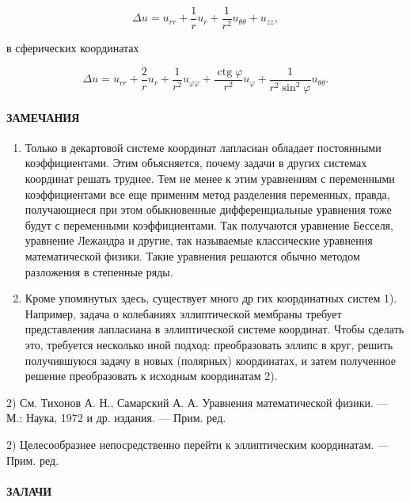 \documentclass[
  ukrainian,
]{article}
\begin{document}
\[
\Delta u = u_{rr} + \frac{1}{r} u_r + \frac{1}{r^2} u_{\theta\theta} + u_{zz},
\]

в сферических координатах

\[
\Delta u = u_{rr} + \frac{2}{r} u_r + \frac{1}{r^2} u_{\varphi\varphi} + \frac{\operatorname{ctg} \varphi}{r^2} u_{\varphi} + \frac{1}{r^2 \sin^2 \varphi} u_{\theta\theta}.
\]

\paragraph{ЗАМЕЧАНИЯ}\label{ux437ux430ux43cux435ux447ux430ux43dux438ux44f-7}

\begin{enumerate}
\def\labelenumi{\arabic{enumi}.}
\item
  Только в декартовой системе координат лапласиан обладает постоянными
  коэффициентами. Этим объясняется, почему задачи в других системах
  координат решать труднее. Тем не менее к этим уравнениям с переменными
  коэффициентами все еще применим метод разделения переменных, правда,
  получающиеся при этом обыкновенные дифференциальные уравнения тоже
  будут с переменными коэффициентами. Так получаются уравнение Бесселя,
  уравнение Лежандра и другие, так называемые классические уравнения
  математической физики. Такие уравнения решаются обычно методом
  разложения в степенные ряды.
\item
  Кроме упомянутых здесь, существует много др гих координатных систем
  1). Например, задача о колебаниях эллиптической мембраны требует
  представления лапласиана в эллиптической системе координат. Чтобы
  сделать это, требуется несколько иной подход: преобразовать эллипс в
  круг, решить получившуюся задачу в новых (полярных) координатах, и
  затем полученное решение преобразовать к исходным координатам 2).
\end{enumerate}

2) См. Тихонов А. Н., Самарский А. А. Уравнения математической физики.
--- М.: Наука, 1972 и др. издания. --- Прим. ред.

2) Целесообразнее непосредственно перейти к эллиптическим координатам.
--- Прим. ред.

\paragraph{ЗАЛАЧИ}\label{ux437ux430ux43bux430ux447ux438}
\end{document}
